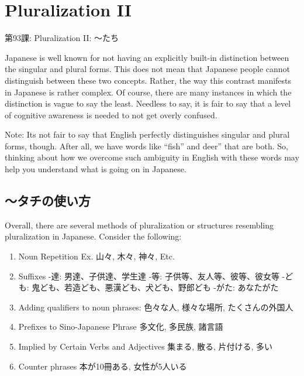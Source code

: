     
\chapter{Pluralization II}

\begin{center}
\begin{Large}
第93課: Pluralization II: ～たち 
\end{Large}
\end{center}
   Japanese is well known for not having an explicitly built-in distinction between the singular and plural forms. This does not mean that Japanese people cannot distinguish between these two concepts. Rather, the way this contrast manifests in Japanese is rather complex. Of course, there are many instances in which the distinction is vague to say the least. Needless to say, it is fair to say that a level of cognitive awareness is needed to not get overly confused. \hfill\break
 
\par{Note: It\textquotesingle s not fair to say that English perfectly distinguishes singular and plural forms, though. After all, we have words like “fish” and deer” that are both. So, thinking about how we overcome such ambiguity in English with these words may help you understand what is going on in Japanese. }
      
\section{～タチの使い方}
 
\par{ Overall, there are several methods of pluralization or structures resembling pluralization in Japanese. Consider the following: }

\begin{enumerate}

\item Noun Repetition \hfill\break
Ex. 山々, 木々, 神々, Etc. 
\item Suffixes \hfill\break
-達: 男達、子供達、学生達 \hfill\break
-等: 子供等、友人等、彼等、彼女等 \hfill\break
-ども: 鬼ども、若造ども、悪漢ども、犬ども、野郎ども \hfill\break
-がた: あなたがた 
\item Adding qualifiers to noun phrases: \hfill\break
色々な人, 様々な場所, たくさんの外国人 
\item Prefixes to Sino-Japanese Phrase \hfill\break
多文化, 多民族, 諸言語 
\item Implied by Certain Verbs and Adjectives \hfill\break
集まる, 散る, 片付ける, 多い 
\item Counter phrases \hfill\break
本が10冊ある, 女性が5人いる 
\end{enumerate}

